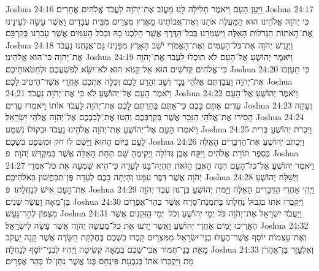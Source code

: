 Joshua 24:16	וַיַּעַן הָעָם וַיֹּאמֶר חָלִילָה לָּנוּ מֵעֲזֹב אֶת־יְהֹוָה לַעֲבֹד אֱלֹהִים אֲחֵרִים׃
Joshua 24:17	כִּי יְהֹוָה אֱלֹהֵינוּ הוּא הַמַּעֲלֶה אֹתָנוּ וְאֶת־אֲבוֹתֵינוּ מֵאֶרֶץ מִצְרַיִם מִבֵּית עֲבָדִים וַאֲשֶׁר עָשָׂה לְעֵינֵינוּ אֶת־הָאֹתוֹת הַגְּדֹלוֹת הָאֵלֶּה וַיִּשְׁמְרֵנוּ בְּכל־הַדֶּרֶךְ אֲשֶׁר הָלַכְנוּ בָהּ וּבְכֹל הָעַמִּים אֲשֶׁר עָבַרְנוּ בְּקִרְבָּם׃
Joshua 24:18	וַיְגָרֶשׁ יְהֹוָה אֶת־כּל־הָעַמִּים וְאֶת־הָאֱמֹרִי יֹשֵׁב הָאָרֶץ מִפָּנֵינוּ גַּם־אֲנַחְנוּ נַעֲבֹד אֶת־יְהֹוָה כִּי־הוּא אֱלֹהֵינוּ׃
Joshua 24:19	וַיֹּאמֶר יְהוֹשֻׁעַ אֶל־הָעָם לֹא תוּכְלוּ לַעֲבֹד אֶת־יְהֹוָה כִּי־אֱלֹהִים קְדֹשִׁים הוּא אֵל־קַנּוֹא הוּא לֹא־יִשָּׂא לְפִשְׁעֲכֶם וּלְחַטֹּאותֵיכֶם׃
Joshua 24:20	כִּי תַעַזְבוּ אֶת־יְהֹוָה וַעֲבַדְתֶּם אֱלֹהֵי נֵכָר וְשָׁב וְהֵרַע לָכֶם וְכִלָּה אֶתְכֶם אַחֲרֵי אֲשֶׁר־הֵיטִיב לָכֶם׃
Joshua 24:21	וַיֹּאמֶר הָעָם אֶל־יְהוֹשֻׁעַ לֹא כִּי אֶת־יְהֹוָה נַעֲבֹד׃
Joshua 24:22	וַיֹּאמֶר יְהוֹשֻׁעַ אֶל־הָעָם עֵדִים אַתֶּם בָּכֶם כִּי־אַתֶּם בְּחַרְתֶּם לָכֶם אֶת־יְהֹוָה לַעֲבֹד אוֹתוֹ וַיֹּאמְרוּ עֵדִים׃
Joshua 24:23	וְעַתָּה הָסִירוּ אֶת־אֱלֹהֵי הַנֵּכָר אֲשֶׁר בְּקִרְבְּכֶם וְהַטּוּ אֶת־לְבַבְכֶם אֶל־יְהֹוָה אֱלֹהֵי יִשְׂרָאֵל׃
Joshua 24:24	וַיֹּאמְרוּ הָעָם אֶל־יְהוֹשֻׁעַ אֶת־יְהֹוָה אֱלֹהֵינוּ נַעֲבֹד וּבְקוֹלוֹ נִשְׁמָע׃
Joshua 24:25	וַיִּכְרֹת יְהוֹשֻׁעַ בְּרִית לָעָם בַּיּוֹם הַהוּא וַיָּשֶׂם לוֹ חֹק וּמִשְׁפָּט בִּשְׁכֶם׃
Joshua 24:26	וַיִּכְתֹּב יְהוֹשֻׁעַ אֶת־הַדְּבָרִים הָאֵלֶּה בְּסֵפֶר תּוֹרַת אֱלֹהִים וַיִּקַּח אֶבֶן גְּדוֹלָה וַיְקִימֶהָ שָּׁם תַּחַת הָאַלָּה אֲשֶׁר בְּמִקְדַּשׁ יְהֹוָה׃ {פ}
Joshua 24:27	וַיֹּאמֶר יְהוֹשֻׁעַ אֶל־כּל־הָעָם הִנֵּה הָאֶבֶן הַזֹּאת תִּהְיֶה־בָּנוּ לְעֵדָה כִּי־הִיא שָׁמְעָה אֵת כּל־אִמְרֵי יְהֹוָה אֲשֶׁר דִּבֶּר עִמָּנוּ וְהָיְתָה בָכֶם לְעֵדָה פֶּן־תְּכַחֲשׁוּן בֵּאלֹהֵיכֶם׃
Joshua 24:28	וַיְשַׁלַּח יְהוֹשֻׁעַ אֶת־הָעָם אִישׁ לְנַחֲלָתוֹ׃ {פ}
Joshua 24:29	וַיְהִי אַחֲרֵי הַדְּבָרִים הָאֵלֶּה וַיָּמת יְהוֹשֻׁעַ בִּן־נוּן עֶבֶד יְהֹוָה בֶּן־מֵאָה וָעֶשֶׂר שָׁנִים׃
Joshua 24:30	וַיִּקְבְּרוּ אֹתוֹ בִּגְבוּל נַחֲלָתוֹ בְּתִמְנַת־סֶרַח אֲשֶׁר בְּהַר־אֶפְרָיִם מִצְּפוֹן לְהַר־גָּעַשׁ׃
Joshua 24:31	וַיַּעֲבֹד יִשְׂרָאֵל אֶת־יְהֹוָה כֹּל יְמֵי יְהוֹשֻׁעַ וְכֹל  יְמֵי הַזְּקֵנִים אֲשֶׁר הֶאֱרִיכוּ יָמִים אַחֲרֵי יְהוֹשֻׁעַ וַאֲשֶׁר יָדְעוּ אֵת כּל־מַעֲשֵׂה יְהֹוָה אֲשֶׁר עָשָׂה לְיִשְׂרָאֵל׃
Joshua 24:32	וְאֶת־עַצְמוֹת יוֹסֵף אֲשֶׁר־הֶעֱלוּ בְנֵי־יִשְׂרָאֵל  מִמִּצְרַיִם קָבְרוּ בִשְׁכֶם בְּחֶלְקַת הַשָּׂדֶה אֲשֶׁר קָנָה יַעֲקֹב מֵאֵת בְּנֵי־חֲמוֹר אֲבִי־שְׁכֶם בְּמֵאָה קְשִׂיטָה וַיִּהְיוּ לִבְנֵי־יוֹסֵף לְנַחֲלָה׃
Joshua 24:33	וְאֶלְעָזָר בֶּן־אַהֲרֹן מֵת וַיִּקְבְּרוּ אֹתוֹ בְּגִבְעַת פִּינְחָס בְּנוֹ אֲשֶׁר נִתַּן־לוֹ בְּהַר אֶפְרָיִם׃
